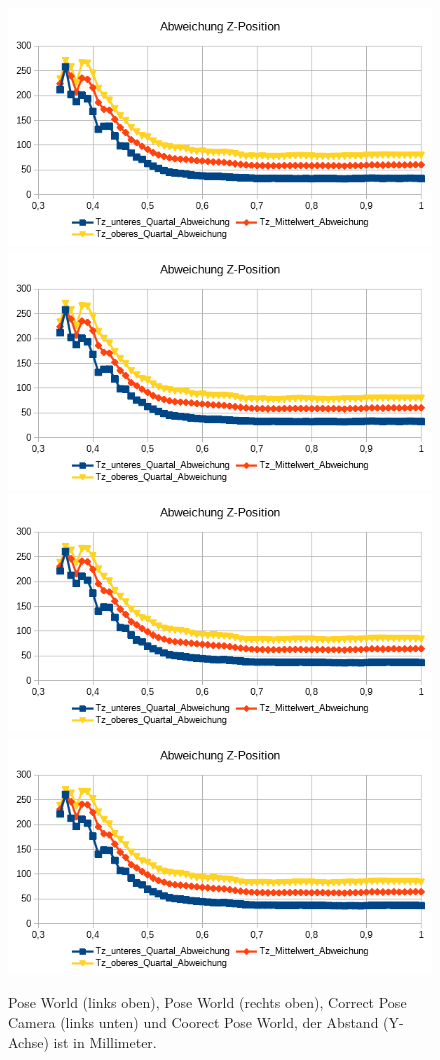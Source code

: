 \begin{figure}
	\centering
	\includegraphics[width=0.45\linewidth]{tabelle/Z_Pos_PC}
	\includegraphics[width=0.45\linewidth]{tabelle/Z_Pos_PW}
	\includegraphics[width=0.45\linewidth]{tabelle/Z_Pos_CPC}
	\includegraphics[width=0.45\linewidth]{tabelle/Z_Pos_CPW}
	\caption{Pose World (links oben), Pose World (rechts oben), Correct Pose Camera (links unten) und Coorect Pose World, der Abstand (Y-Achse) ist in Millimeter.}
	\label{img_Z_Pos}
\end{figure}
